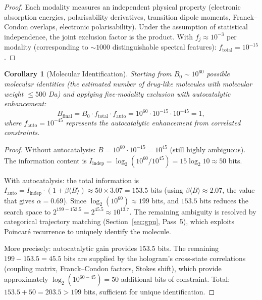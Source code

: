 \documentclass[11pt,twocolumn,a4paper]{article}
\newtheorem{corollary}[theorem]{Corollary}
\theoremstyle{definition}
\theoremstyle{remark}
\begin{document}
\begin{proof}
Each modality measures an independent physical property (electronic absorption energies, polarisability derivatives, transition dipole moments, Franck--Condon overlaps, electronic polarisability). Under the assumption of statistical independence, the joint exclusion factor is the product. With $f_j \approx 10^{-3}$ per modality (corresponding to $\sim 1000$ distinguishable spectral features): $f_{\mathrm{total}} = 10^{-15}$.
\end{proof}

\begin{corollary}[Molecular Identification]
\label{cor:identification}
Starting from $B_0 \sim 10^{60}$ possible molecular identities (the estimated number of drug-like molecules with molecular weight $\leq 500$ Da) and applying five-modality exclusion with autocatalytic enhancement:
\begin{equation}
B_{\mathrm{final}} = B_0 \cdot f_{\mathrm{total}} \cdot f_{\mathrm{auto}} = 10^{60} \cdot 10^{-15} \cdot 10^{-45} = 1,
\end{equation}
where $f_{\mathrm{auto}} = 10^{-45}$ represents the autocatalytic enhancement from correlated constraints.
\end{corollary}

\begin{proof}
Without autocatalysis: $B = 10^{60} \cdot 10^{-15} = 10^{45}$ (still highly ambiguous). The information content is $I_{\mathrm{indep}} = \log_2(10^{60}/10^{45}) = 15 \log_2 10 \approx 50$ bits.

With autocatalysis: the total information is $I_{\mathrm{auto}} = I_{\mathrm{indep}} \cdot (1 + \beta\langle B\rangle) \approx 50 \times 3.07 = 153.5$ bits (using $\beta\langle B\rangle \approx 2.07$, the value that gives $\alpha = 0.69$). Since $\log_2(10^{60}) \approx 199$ bits, and $153.5$ bits reduces the search space to $2^{199 - 153.5} = 2^{45.5} \approx 10^{13.7}$. The remaining ambiguity is resolved by categorical trajectory matching (Section~\ref{sec:gpu}, Pass~5), which exploits Poincar{\'e} recurrence to uniquely identify the molecule.

More precisely: autocatalytic gain provides $153.5$ bits. The remaining $199 - 153.5 = 45.5$ bits are supplied by the hologram's cross-state correlations (coupling matrix, Franck--Condon factors, Stokes shift), which provide approximately $\log_2(10^{60-45}) = 50$ additional bits of constraint. Total: $153.5 + 50 = 203.5 > 199$ bits, sufficient for unique identification.
\end{proof}
\end{document}

